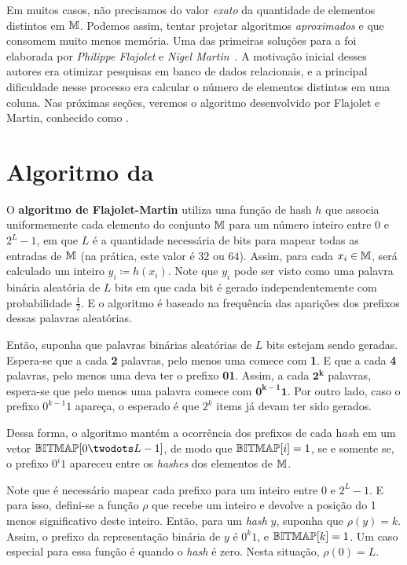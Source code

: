 Em muitos casos, não precisamos do valor \textit{exato} da quantidade de elementos distintos em $\mathbb{M}$. Podemos assim, 
tentar projetar algoritmos \textit{aproximados} e que consomem muito menos memória. Uma das primeiras soluções para a 
 foi elaborada por \textit{Philippe Flajolet} e 
\textit{Nigel Martin}~\citep{flajolet:martin:85}. A motivação inicial desses autores era otimizar pesquisas em banco de
dados relacionais, e a principal dificuldade nesse processo era calcular o número de elementos distintos em uma coluna.
Nas próximas seções, veremos o algoritmo desenvolvido por Flajolet e Martin, conhecido como 
.

\section{Algoritmo da }
\label{sec:flajolet-martin:algorithm}

O \textbf{algoritmo de Flajolet-Martin} utiliza uma função de hash $h$ que associa uniformemente cada elemento do 
conjunto $\mathbb{M}$ para um número inteiro entre $0$ e $2^L-1$, em que $L$ é a quantidade necessária de bits para 
mapear todas as entradas de $\mathbb{M}$ (na prática, este valor é $32$ ou $64$). Assim, para cada $x_i \in \mathbb{M}$, 
será calculado um inteiro $y_i \coloneqq h(x_i)$. Note que $y_i$ pode ser visto como uma palavra binária aleatória de 
$L$ bits em que cada bit é gerado independentemente com probabilidade $\frac{1}{2}$. E o algoritmo é baseado na 
frequência das aparições dos prefixos dessas palavras aleatórias.

Então, suponha que palavras binárias aleatórias de $L$ bits estejam sendo geradas. Espera-se que a cada \textbf{2} 
palavras, pelo menos uma comece com \textbf{1}. E que a cada \textbf{4} palavras, pelo menos uma deva ter o prefixo 
\textbf{01}. Assim, a cada $\mathbf{2^k}$ palavras, espera-se que pelo menos uma palavra comece com $\mathbf{0^{k-1}1}$. 
Por outro lado, caso o prefixo $0^{k-1}1$ apareça, o esperado é que $2^{k}$ items já devam ter sido gerados. 

Dessa forma, o algoritmo mantém a ocorrência dos prefixos de cada $\textit{hash}$ em um vetor 
$\bitmap[0 \twodots L - 1]$, de modo que $\mathbb{BITMAP}[i] = 1$, se e somente se, o prefixo $0^i1$ apareceu entre os 
\textit{hashes} dos elementos de $\mathbb{M}$. 

Note que é necessário mapear cada prefixo para um inteiro entre $0$ e $2^{L} - 1$. E para isso, defini-se a função $\rho$ 
que recebe um inteiro e devolve a posição do 1 menos significativo deste inteiro. Então, para um \textit{hash} $y$, 
suponha que $\rho(y) = k$. Assim, o prefixo da representação binária de $y$ é $0^k1$, e $\mathbb{BITMAP}[k] = 1$. Um caso 
especial para essa função é quando o \textit{hash} é zero. Nesta situação, $\rho(0) = L$.

